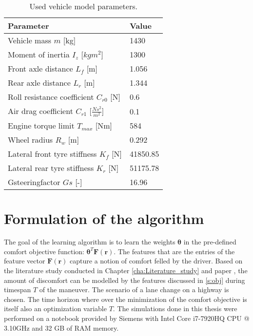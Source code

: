 \begin{table}[h]
	\centering
	\begin{tabular}{|p{5cm}|p{2cm}|}
		\hline
		\textbf{Parameter} & \textbf{Value}\\ \hline		
		Vehicle mass $m$ [kg] & 1430\\ \hline
		Moment of inertia $I_z$ [$kgm^2$] & 1300\\ \hline
		Front axle distance $L_f$ [m] & 1.056\\ \hline
		Rear axle distance $L_r$ [m] & 1.344\\ \hline
		Roll resistance coefficient $C_{r0}$ [N] & 0.6\\ \hline
		Air drag coefficient $C_{r1}$ [$\frac{Ns^2}{m^2}$] & 0.1\\ \hline
		Engine torque limit $T_{max}$ [Nm] & 584\\ \hline
		Wheel radius $R_w$ [m] & 0.292\\ \hline
		Lateral front tyre stiffness $K_{f}$ [N] & 41850.85\\ \hline
		Lateral rear tyre stiffness $K_{r}$ [N] & 51175.78\\ \hline
		Gsteeringfactor $Gs$ [-] &16.96 \\ \hline
		
	\end{tabular}
	\caption{Used vehicle model parameters.}
	\label{table:vehicel_model_param}
\end{table}
\newpage
\section{Formulation of the algorithm}
The goal of the learning algorithm is to learn the weights $\bm{\theta}$ in the pre-defined comfort objective function: $\bm{\theta}^T\bm{F}(\bm{r})$. The features that are the entries of the feature vector $\bm{F}(\bm{r})$ capture a notion of comfort felled by the driver. Based on the literature study conducted in Chapter \ref{cha:Literature_study} and paper \cite{Kuderer2015a}, the amount of discomfort can be modelled by the features discussed in \ref{s:obj} during timespan $T$ of the maneuver. The scenario of a lane change on a highway is chosen. The time horizon where over the minimization of the comfort objective is itself also an optimization variable  $T$. The simulations done in this thesis were performed on a notebook provided by Siemens with Intel Core i7-7920HQ CPU @ 3.10GHz and 32 GB of RAM memory.\\


